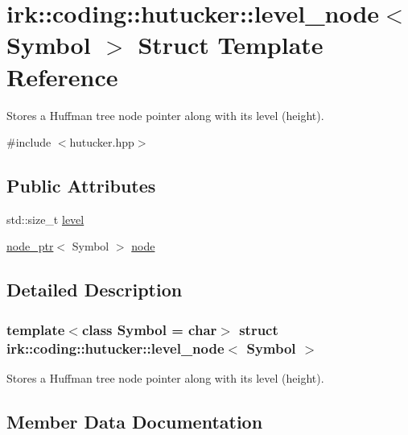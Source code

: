 \hypertarget{structirk_1_1coding_1_1hutucker_1_1level__node}{}\section{irk\+:\+:coding\+:\+:hutucker\+:\+:level\+\_\+node$<$ Symbol $>$ Struct Template Reference}
\label{structirk_1_1coding_1_1hutucker_1_1level__node}


Stores a Huffman tree node pointer along with its level (height).  




{\ttfamily \#include $<$hutucker.\+hpp$>$}

\subsection*{Public Attributes}
\begin{DoxyCompactItemize}
\item 
std\+::size\+\_\+t \mbox{\hyperlink{structirk_1_1coding_1_1hutucker_1_1level__node_a3675ec8200d4619e7fbad729d80c5f48}{level}}
\item 
\mbox{\hyperlink{namespaceirk_1_1coding_1_1hutucker_aa5d22cfdf05ffec38f2531e0307248fe}{node\+\_\+ptr}}$<$ Symbol $>$ \mbox{\hyperlink{structirk_1_1coding_1_1hutucker_1_1level__node_acaf0bdb35aa0ca18c9c1ce0fda27732b}{node}}
\end{DoxyCompactItemize}


\subsection{Detailed Description}
\subsubsection*{template$<$class Symbol = char$>$\newline
struct irk\+::coding\+::hutucker\+::level\+\_\+node$<$ Symbol $>$}

Stores a Huffman tree node pointer along with its level (height). 

\subsection{Member Data Documentation}
\mbox{\label{structirk_1_1coding_1_1hutucker_1_1level__node_a3675ec8200d4619e7fbad729d80c5f48}} 
